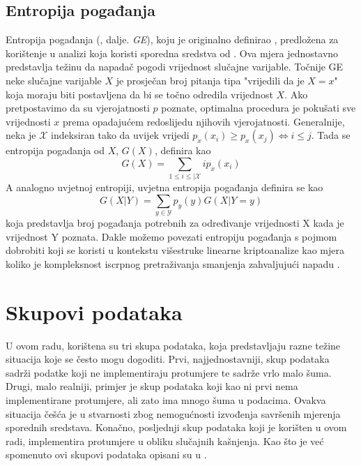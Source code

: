 \documentclass[times, utf8, diplomski]{fer}
\begin{document}
\subsection{Entropija pogađanja}

Entropija pogađanja (, dalje. \emph{GE}), koju je originalno definirao \cite{massey1994guessing}, predložena za korištenje u analizi koja koristi sporedna sredstva od \cite{kopf2007information}. Ova mjera jednostavno predstavlja težinu da napadač pogodi vrijednost slučajne varijable. Točnije GE neke slučajne varijable $X$ je prosječan broj pitanja tipa "vrijedili da je $X = x$" koja moraju biti postavljena da bi se točno odredila vrijednost $X$. Ako pretpostavimo da su vjerojatnosti $p$ poznate, optimalna procedura je pokušati sve vrijednosti $x$ prema opadajućem redoslijedu njihovih vjerojatnosti. Generalnije, neka je $\mathcal{X}$ indeksiran tako da uvijek vrijedi $p_x(x_i) \ge p_x(x_j) \iff i \le j$. Tada se entropija pogađanja od $X$, $G(X)$, definira kao
\begin{equation}
    G(X) = \sum_{1 \le i \le \vert \mathcal{X}} i p_x(x_i)
\end{equation}
A analogno uvjetnoj entropiji, uvjetna entropija pogađanja definira se kao
\begin{equation}
    G(X \vert Y) = \sum_{y \in \mathcal{Y}} p_y(y) G(X \vert Y = y)
\end{equation}
koja predstavlja broj pogađanja potrebnih za određivanje vrijednosti X kada je vrijednost Y poznata. Dakle možemo povezati entropiju pogađanja s pojmom dobrobiti koji se koristi u kontekstu višestruke linearne kriptoanalize kao mjera koliko je kompleksnost iscrpnog pretraživanja smanjenja zahvaljujući napadu \citep{standaert2009unified}.

\section{Skupovi podataka}
U ovom radu, korištena su tri skupa podataka, koja predstavljaju razne težine situacija koje se često mogu dogoditi. Prvi, najjednostavniji, skup podataka sadrži podatke koji ne implementiraju protumjere te sadrže vrlo malo šuma. Drugi, malo realniji, primjer je skup podataka koji kao ni prvi nema implementirane protumjere, ali zato ima mnogo šuma u podacima. Ovakva situacija češća je u stvarnosti zbog nemogućnosti izvođenja savršenih mjerenja sporednih sredstava. Konačno, posljednji skup podataka koji je korišten u ovom radi, implementira protumjere u obliku slučajnih kašnjenja. Kao što je već spomenuto ovi skupovi podataka opisani su u \cite{8836108}.
\end{document}
